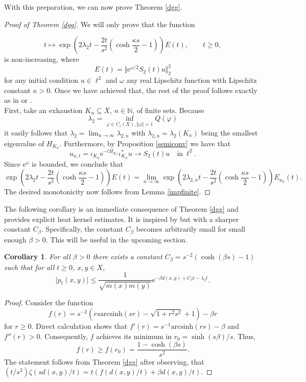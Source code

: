 \documentclass[10pt]{amsart}
\newtheorem{corollary}[theorem]{Corollary}
\theoremstyle{definition}
\newcommand{\eat}[1]{}
\begin{document}
With this preparation, we can now prove Theorem \ref{dgg}.

\begin{proof}[Proof of Theorem \ref{dgg}]
We will only prove that the function

\[t\mapsto\exp{\left(2\lambda_2t-\frac{2t}{s^2}(\cosh{\frac{\kappa s}{2}-1})\right)}E(t),\qquad t\geq 0,\]
is non-increasing, where \[E(t) = \Vert\mathrm{e}^{\omega\slash 2}S_2(t)u\Vert^2_2\]
for any initial condition $u\in\ell^2$ and $\omega$ any real Lipschitz function with Lipschitz constant $\kappa>0.$ Once we have achieved that, the rest of the proof follows exactly as in \cite[Theorem~1.2]{HL} or \cite[Theorem~1.1]{BHY2}.\\
First, take an exhaustion $K_n\subseteq X$, $n\in\mathbb{N}$, of finite sets. Because \[\lambda_2 = \inf_{\varphi\in C_c( X),\Vert\varphi\Vert=1}{Q(\varphi)} \] it easily follows that $\lambda_2 = \lim_{n\to\infty}\lambda_{2,n}$ with $\lambda_{2,n}=\lambda_2(K_n)$ being the smallest eigenvalue of $H_{K_n}$. Furthermore, by Proposition \ref{semiconv} we have that 
    \[ u_{n,t} = \iota_{K_n}\mathrm{e}^{-tH_{K_n}}\iota_{K_n}^*u\rightarrow S_2(t)u\quad\text{in}~\ell^2.\] Since $\mathrm{e}^\omega$ is bounded, we conclude that
\[\exp{\left(2\lambda_2 t-\frac{2t}{s^2}(\cosh{\frac{\kappa s}{2}}-1)\right)}E(t) = \lim_{n\to\infty}\exp{\left(2\lambda_{2,n} t-\frac{2t}{s^2}(\cosh{\frac{\kappa s}{2}}-1)\right)}E_{u_n}(t).\]
The desired monotonicity now follows from Lemma \ref{impfinite}.
\eat{We assume that $d(A,B)<\infty$ because otherwise the statement simply follows from the Cauchy-Schwarz inequality. The rest of the proof   now carries over verbatim from \cite[Theorem~1.2]{HuaLuo} or \cite[Theorem~1.1]{BauerHuaYau}.    }
\end{proof}


The following corollary is an immediate consequence of Theorem \ref{dgg} and provides explicit heat kernel estimates. It is inspired by \cite[Lemma~3.7]{BauerHuaKeller} but with a sharper constant $C_\beta$. Specifically, the constant $C_\beta$ becomes arbitrarily small for small enough $\beta>0.$ This will be useful in the upcoming section.


\begin{corollary}\label{DGGCorollary}
  For all $\beta>0$ there exists a constant $C_\beta = s^{-2}(\cosh(\beta s)-1)$ such that for all $t\geq 0$, $x,y\in X$,
    \[\vert p_t(x,y)\vert\leq \frac{1}{\sqrt{m(x)m(y)}}\mathrm{e}^{-\beta d(x,y)+C_\beta t-\lambda_2t}.\]
\end{corollary}
\begin{proof}
    Consider the function \[f(r) = s^{-2}\left(rs\mathrm{arcsinh}(sr)-\sqrt{1+r^2s^2}+1\right)-\beta r\]
for $r\geq 0.$ Direct calculation shows that $f'(r) = s^{-1}\mathrm{arcsinh}(rs)-\beta$ and $f''(r)>0.$ Consequently, $f$ achieves its minimum in $r_0 = \sinh{(s\beta)}\slash s.$ Thus,
\[f(r)\geq f(r_0) = \frac{1-\cosh(\beta s)}{s^2}.\]
The statement follows from Theorem \ref{dgg} after observing, that $(t/s^2)\zeta(sd( x, y)/t) = t(f(d( x, y)\slash t)+\beta d( x, y)\slash t).$
\end{proof}
\end{document}
